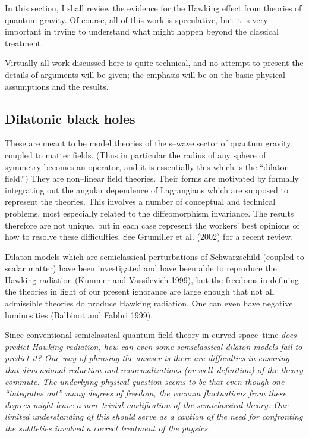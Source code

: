 In this section, I shall review the evidence for the Hawking effect from
theories of quantum gravity.  Of course, all of this work is speculative, but
it is very important in trying to understand what might happen beyond the
classical treatment.

Virtually all work discussed here is quite technical, and no attempt to present
the details of arguments will be given; the emphasis will be on the basic
physical assumptions and the results.

\subsection{Dilatonic black holes}

These are meant to be model theories of the s--wave sector of quantum gravity
coupled to matter fields.   (Thus in particular the radius of any sphere of
symmetry becomes an operator, and it is essentially this which is the ``dilaton
field.'') They are non--linear field theories. Their forms are motivated by
formally integrating out the angular dependence of Lagrangians which are
supposed to represent the theories.  This involves a number of conceptual and
technical problems, most especially related to the diffeomorphism invariance. 
The results therefore are not unique, but in each case represent the workers'
best opinions of how to resolve these difficulties.  See Grumiller et al.
(2002) for a recent review.

Dilaton models which are semiclassical perturbations of Schwarzschild (coupled
to scalar matter) have been investigated and have been able to reproduce the
Hawking radiation (Kummer and Vassilevich 1999),  but the freedoms in defining
the theories in light of our present ignorance are large enough that not all
admissible theories do produce Hawking radiation. One can even have negative
luminosities (Balbinot and Fabbri 1999).  

Since conventional semiclassical quantum field theory in curved space--time \it
does \rm predict Hawking radiation, how can even some semiclassical dilaton
models fail to predict it?  One way of phrasing the answer is there are
difficulties in ensuring that dimensional reduction and renormalizations (or
well--definition) of the theory commute.   The underlying physical question
seems to be that even though one ``integrates out'' many degrees of freedom,
the vacuum fluctuations from these degrees might leave a non--trivial
modification of the semiclassical theory. Our limited understanding of this
should serve as a caution of the need for confronting the  subtleties involved
a correct treatment of the physics.


